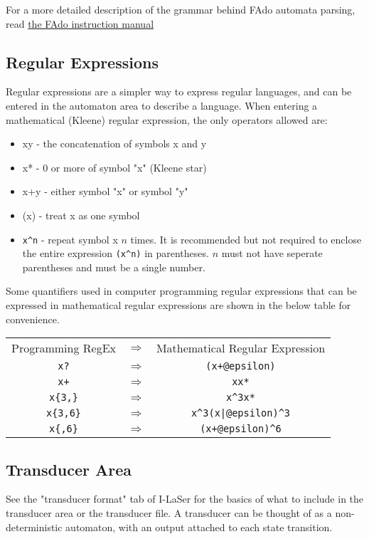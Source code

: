 \documentclass{article}
\begin{document}
\par For a more detailed description of the grammar behind FAdo automata parsing, read \href{https://www.dcc.fc.up.pt/~rvr/FAdo.pdf}{the FAdo instruction manual}

\subsection{Regular Expressions}
Regular expressions are a simpler way to express regular languages, and can be entered in the automaton area to describe a language.
When entering a mathematical (Kleene) regular expression, the only operators allowed are:
\begin{itemize}
\item xy - the concatenation of symbols x and y
\item x* - 0 or more of symbol "x" (Kleene star)
\item x+y - either symbol "x" or symbol "y"
\item (x) - treat x as one symbol
\item \verb-x^n- - repeat symbol x $n$ times. It is recommended but not required to enclose the entire expression \verb-(x^n)- in parentheses. $n$ must not have seperate parentheses and must be a single number. 
\end{itemize}

\par Some quantifiers used in computer programming regular expressions that can be expressed in mathematical regular expressions are shown in the below table for convenience.
\begin{center}
\begin{tabular}{c c c}
Programming RegEx & $\Rightarrow$ & Mathematical Regular Expression \\
\verb-x?- & $\Rightarrow$ & \verb-(x+@epsilon)-\\
\verb-x+- & $\Rightarrow$ & \verb-xx*- \\
\verb-x{3,}- & $\Rightarrow$ & \verb-x^3x*- \\
\verb-x{3,6}- & $\Rightarrow$ & \verb-x^3(x|@epsilon)^3- \\
\verb-x{,6}- & $\Rightarrow$ & \verb-(x+@epsilon)^6- \\
\end{tabular}
\end{center}



\subsection{Transducer Area}
See the "transducer format" tab of I-LaSer for the basics of what to include in the transducer area or the transducer file.
A transducer can be thought of as a non-deterministic automaton, with an output attached to each state transition.
\end{document}

